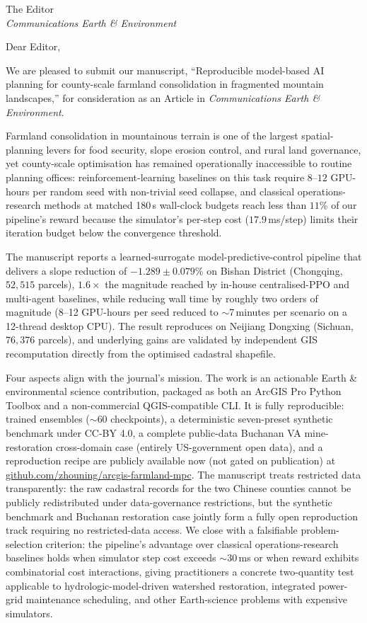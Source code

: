\documentclass[11pt]{letter}
\begin{document}
\begin{letter}{The Editor \\ \textit{Communications Earth \& Environment}}

\opening{Dear Editor,}

We are pleased to submit our manuscript, ``Reproducible model-based AI planning for county-scale farmland consolidation in fragmented mountain landscapes,'' for consideration as an Article in \textit{Communications Earth \& Environment}.

Farmland consolidation in mountainous terrain is one of the largest spatial-planning levers for food security, slope erosion control, and rural land governance, yet county-scale optimisation has remained operationally inaccessible to routine planning offices: reinforcement-learning baselines on this task require $8$--$12$ GPU-hours per random seed with non-trivial seed collapse, and classical operations-research methods at matched 180\,s wall-clock budgets reach less than $11\%$ of our pipeline's reward because the simulator's per-step cost ($17.9$\,ms/step) limits their iteration budget below the convergence threshold.

The manuscript reports a learned-surrogate model-predictive-control pipeline that delivers a slope reduction of $-1.289 \pm 0.079\%$ on Bishan District (Chongqing, $52{,}515$ parcels), $1.6\times$ the magnitude reached by in-house centralised-PPO and multi-agent baselines, while reducing wall time by roughly two orders of magnitude (8--12 GPU-hours per seed reduced to $\sim$7\,minutes per scenario on a 12-thread desktop CPU). The result reproduces on Neijiang Dongxing (Sichuan, $76{,}376$ parcels), and underlying gains are validated by independent GIS recomputation directly from the optimised cadastral shapefile.

Four aspects align with the journal's mission. The work is an actionable Earth \& environmental science contribution, packaged as both an ArcGIS Pro Python Toolbox and a non-commercial QGIS-compatible CLI. It is fully reproducible: trained ensembles ($\sim$$60$ checkpoints), a deterministic seven-preset synthetic benchmark under CC-BY 4.0, a complete public-data Buchanan VA mine-restoration cross-domain case (entirely US-government open data), and a reproduction recipe are publicly available now (not gated on publication) at \href{https://github.com/zhouning/arcgis-farmland-mpc}{github.com/zhouning/arcgis-farmland-mpc}. The manuscript treats restricted data transparently: the raw cadastral records for the two Chinese counties cannot be publicly redistributed under data-governance restrictions, but the synthetic benchmark and Buchanan restoration case jointly form a fully open reproduction track requiring no restricted-data access. We close with a falsifiable problem-selection criterion: the pipeline's advantage over classical operations-research baselines holds when simulator step cost exceeds $\sim$$30$\,ms or when reward exhibits combinatorial cost interactions, giving practitioners a concrete two-quantity test applicable to hydrologic-model-driven watershed restoration, integrated power-grid maintenance scheduling, and other Earth-science problems with expensive simulators.


\end{letter}
\end{document}
